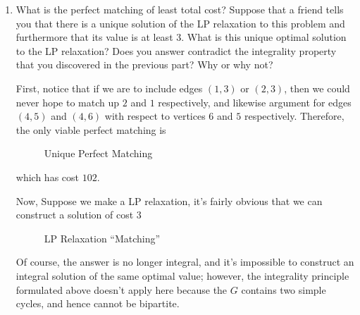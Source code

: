 \documentclass[12pt,a4paper,svgnames]{article}
\begin{document}
\begin{enumerate}[label=\textbf{Exercise \arabic*\ }]
\begin{enumerate}
\begin{enumerate}
\item What is the perfect matching of least total cost? Suppose that a friend tells you that there is a unique solution of the LP relaxation to this problem and furthermore that its value is at least 3. What is this unique optimal solution to the LP relaxation? Does you answer contradict the integrality property that you discovered in the previous part? Why or why not?

\vspace{4mm}
First, notice that if we are to include edges $(1,3)$ or $(2,3)$, then we could never hope to match up $2$ and $1$ respectively, and likewise argument for edges $(4,5)$ and $(4,6)$ with respect to vertices $6$ and $5$ respectively. Therefore, the only viable perfect matching is

\begin{figure}[H]
\centering
\caption{Unique Perfect Matching}
\end{figure}
which has cost $102$.

Now, Suppose we make a LP relaxation, it's fairly obvious that we can construct a solution of cost $3$
\begin{figure}[H]
\centering
\caption{LP Relaxation ``Matching''}
\end{figure}
Of course, the answer is no longer integral, and it's impossible to construct an integral solution of the same optimal value; however, the integrality principle formulated above doesn't apply here because the $G$ contains two simple cycles, and hence cannot be bipartite.


\end{enumerate}
\end{enumerate}
\end{enumerate}
\end{document}
